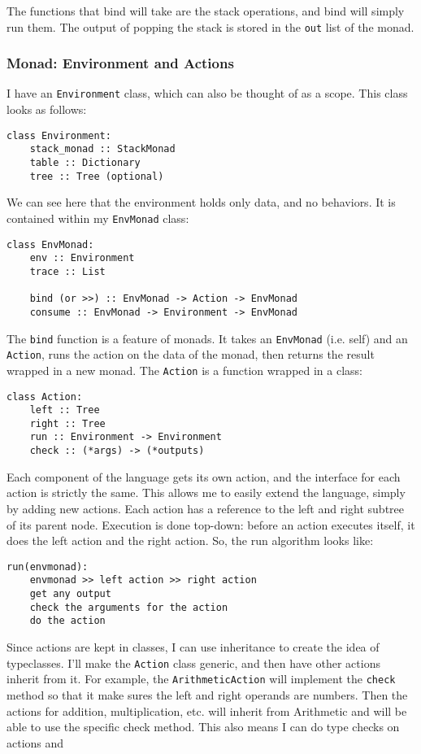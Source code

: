 \documentclass[a4paper, 12pt]{article}
\begin{document}
The functions that bind will take are the stack operations, and bind will simply run them. The output of popping the stack is stored in the \verb|out| list of the monad.\\
\subsubsection{Monad: Environment and Actions}\label{sec:monad-environment-and-actions}
I have an \verb|Environment| class, which can also be thought of as a scope. This class looks as follows:
\begin{verbatim}
class Environment:
    stack_monad :: StackMonad
    table :: Dictionary
    tree :: Tree (optional)
\end{verbatim}

We can see here that the environment holds only data, and no behaviors. It is contained within my \verb|EnvMonad| class:
\begin{verbatim}
class EnvMonad:
    env :: Environment
    trace :: List
    
    bind (or >>) :: EnvMonad -> Action -> EnvMonad
    consume :: EnvMonad -> Environment -> EnvMonad
\end{verbatim}

The \verb|bind| function is a feature of monads. It takes an \verb|EnvMonad| (i.e. self) and an \verb|Action|, runs the action on the data of the monad, then returns the result wrapped in a new monad. The \verb|Action| is a function wrapped in a class:
\begin{verbatim}
class Action:
    left :: Tree
    right :: Tree
    run :: Environment -> Environment
    check :: (*args) -> (*outputs)
\end{verbatim}

Each component of the language gets its own action, and the interface for each action is strictly the same. This allows me to easily extend the language, simply by adding new actions. Each action has a reference to the left and right subtree of its parent node. Execution is done top-down: before an action executes itself, it does the left action and the right action. So, the run algorithm looks like:

\begin{verbatim}
run(envmonad):
    envmonad >> left action >> right action
    get any output
    check the arguments for the action
    do the action
\end{verbatim}

Since actions are kept in classes, I can use inheritance to create the idea of typeclasses. I'll make the \verb|Action| class generic, and then have other actions inherit from it. For example, the \verb|ArithmeticAction| will implement the \verb|check| method so that it make sures the left and right operands are numbers. Then the actions for addition, multiplication, etc. will inherit from Arithmetic and will be able to use the specific check method. This also means I can do type checks on actions and 
\\
\end{document}
